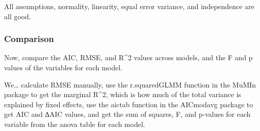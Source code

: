 \documentclass[
]{article}
\begin{document}
All assumptions, normality, linearity, equal error variance, and
independence are all good.

\hypertarget{comparison-1}{%
\subsubsection{Comparison}\label{comparison-1}}

Now, compare the AIC, RMSE, and R\^{}2 values across models, and the F
and p values of the variables for each model.

We\ldots{} calculate RMSE manually, use the r.squaredGLMM function in
the MuMIn package to get the marginal R\^{}2, which is how much of the
total variance is explained by fixed effects, use the aictab function in
the AICmodavg package to get AIC and ∆AIC values, and get the sum of
squares, F, and p-values for each variable from the anova table for each
model.
\end{document}
